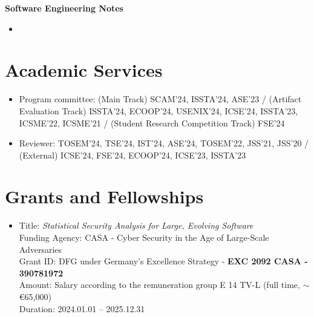 \documentclass[letterpaper,11pt]{article}
\begin{document}
\textbf{Software Engineering Notes}\vspace{-4pt}
\begin{itemize}
  \item {}
\end{itemize}

\section{Academic Services}
\begin{itemize}
  
  \item Program committee: (Main Track) SCAM'24, ISSTA'24, ASE'23 / (Artifact Evaluation Track) ISSTA'24, ECOOP'24, USENIX'24, ICSE'24, ISSTA'23, ICSME'22, ICSME'21 / (Student Research Competition Track) FSE'24
  \item Reviewer: TOSEM'24, TSE'24, IST'24, ASE'24, TOSEM'22, JSS'21, JSS'20  / (External) ICSE'24, FSE'24, ECOOP'24, ICSE'23, ISSTA'23
\end{itemize}

\section{Grants and Fellowships}
\begin{itemize}
  \item Title: \emph{Statistical Security Analysis for Large, Evolving Software} \\ 
  Funding Agency: CASA - Cyber Security in the Age of Large-Scale Adversaries \\ 
  Grant ID: DFG under Germany's Excellence Strategy - \textbf{EXC 2092 CASA - 390781972} \\ 
  Amount: Salary according to the remuneration group E 14 TV-L (full time, $\sim$ \euro{65,000}) \\
  Duration: 2024.01.01 -- 2025.12.31
\end{itemize}
\end{document}
